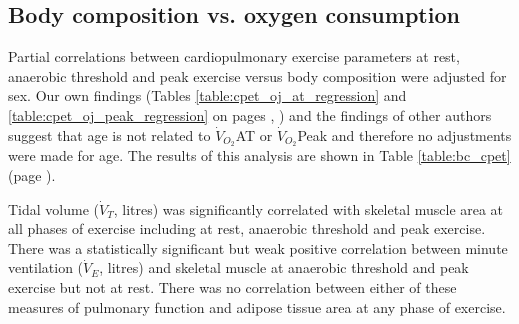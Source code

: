 
\subsection{Body composition vs. oxygen consumption}

Partial correlations between cardiopulmonary exercise parameters at rest, anaerobic threshold and peak exercise versus body composition were adjusted for sex. 
Our own findings (Tables \ref{table:cpet_oj_at_regression} and \ref{table:cpet_oj_peak_regression} on pages \pageref{table:cpet_oj_at_regression}, \pageref{table:cpet_oj_peak_regression}) and the findings of other authors suggest that age is not related to $\dot{V}_{O_2}$AT or $\dot{V}_{O_2}$Peak and therefore no adjustments were made for age. 
The results of this analysis are shown in Table \ref{table:bc_cpet} (page \pageref{table:bc_cpet}).

Tidal volume ($\dot{V}_T$, litres) was significantly correlated with skeletal muscle area at all phases of exercise including at rest, anaerobic threshold and peak exercise. 
There was a statistically significant but weak positive correlation between minute ventilation ($\dot{V}_E$, litres) and skeletal muscle at anaerobic threshold and peak exercise but not at rest. 
There was no correlation between either of these measures of pulmonary function and adipose tissue area at any phase of exercise.

